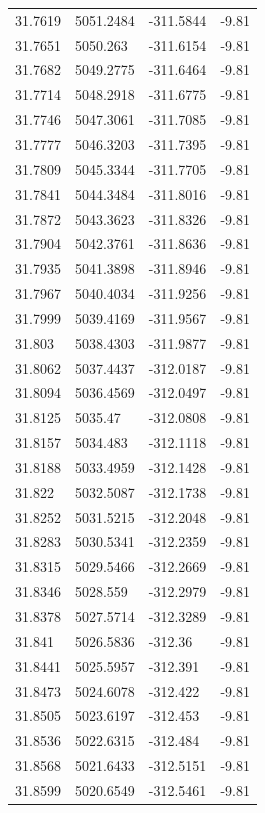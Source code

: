 \begin{table}[H]
\begin{tabular}{llll}
31.7619 & 5051.2484 & -311.5844 & -9.81 \\
31.7651 & 5050.263 & -311.6154 & -9.81 \\
31.7682 & 5049.2775 & -311.6464 & -9.81 \\
31.7714 & 5048.2918 & -311.6775 & -9.81 \\
31.7746 & 5047.3061 & -311.7085 & -9.81 \\
31.7777 & 5046.3203 & -311.7395 & -9.81 \\
31.7809 & 5045.3344 & -311.7705 & -9.81 \\
31.7841 & 5044.3484 & -311.8016 & -9.81 \\
31.7872 & 5043.3623 & -311.8326 & -9.81 \\
31.7904 & 5042.3761 & -311.8636 & -9.81 \\
31.7935 & 5041.3898 & -311.8946 & -9.81 \\
31.7967 & 5040.4034 & -311.9256 & -9.81 \\
31.7999 & 5039.4169 & -311.9567 & -9.81 \\
31.803 & 5038.4303 & -311.9877 & -9.81 \\
31.8062 & 5037.4437 & -312.0187 & -9.81 \\
31.8094 & 5036.4569 & -312.0497 & -9.81 \\
31.8125 & 5035.47 & -312.0808 & -9.81 \\
31.8157 & 5034.483 & -312.1118 & -9.81 \\
31.8188 & 5033.4959 & -312.1428 & -9.81 \\
31.822 & 5032.5087 & -312.1738 & -9.81 \\
31.8252 & 5031.5215 & -312.2048 & -9.81 \\
31.8283 & 5030.5341 & -312.2359 & -9.81 \\
31.8315 & 5029.5466 & -312.2669 & -9.81 \\
31.8346 & 5028.559 & -312.2979 & -9.81 \\
31.8378 & 5027.5714 & -312.3289 & -9.81 \\
31.841 & 5026.5836 & -312.36 & -9.81 \\
31.8441 & 5025.5957 & -312.391 & -9.81 \\
31.8473 & 5024.6078 & -312.422 & -9.81 \\
31.8505 & 5023.6197 & -312.453 & -9.81 \\
31.8536 & 5022.6315 & -312.484 & -9.81 \\
31.8568 & 5021.6433 & -312.5151 & -9.81 \\
31.8599 & 5020.6549 & -312.5461 & -9.81 \\

\end{tabular}
\end{table}
